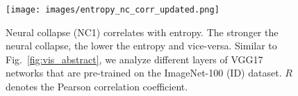 \begin{figure}[t]
    \centering
    \texttt{[image: images/entropy\_nc\_corr\_updated.png]}
  \caption{Neural collapse (NC1) correlates with entropy. The stronger the neural collapse, the lower the entropy and vice-versa.
  Similar to Fig.~\ref{fig:vis_abstract}, we analyze different layers of VGG17 networks that are pre-trained on the ImageNet-100 (ID) dataset. 
  $R$ denotes the Pearson correlation coefficient.
  } 
  \label{fig:entropy_nc}
\end{figure}